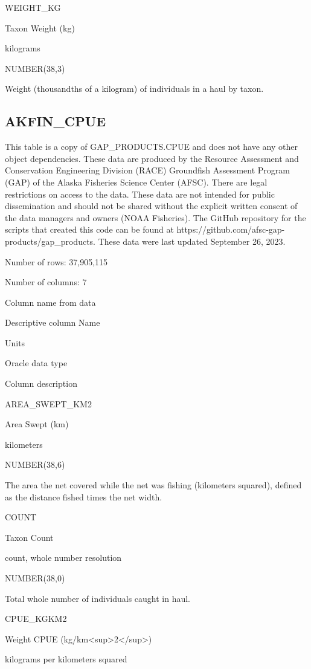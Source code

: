 \documentclass[
  letterpaper,
  oneside,
  open=any]{scrbook}
\begin{document}
WEIGHT\_KG

Taxon Weight (kg)

kilograms

NUMBER(38,3)

Weight (thousandths of a kilogram) of individuals in a haul by taxon.

\hypertarget{akfin_cpue}{%
\subsection{AKFIN\_CPUE}\label{akfin_cpue}}

This table is a copy of GAP\_PRODUCTS.CPUE and does not have any other
object dependencies. These data are produced by the Resource Assessment
and Conservation Engineering Division (RACE) Groundfish Assessment
Program (GAP) of the Alaska Fisheries Science Center (AFSC). There are
legal restrictions on access to the data. These data are not intended
for public dissemination and should not be shared without the explicit
written consent of the data managers and owners (NOAA Fisheries). The
GitHub repository for the scripts that created this code can be found at
https://github.com/afsc-gap-products/gap\_products. These data were last
updated September 26, 2023.

Number of rows: 37,905,115

Number of columns: 7

Column name from data

Descriptive column Name

Units

Oracle data type

Column description

AREA\_SWEPT\_KM2

Area Swept (km)

kilometers

NUMBER(38,6)

The area the net covered while the net was fishing (kilometers squared),
defined as the distance fished times the net width.

COUNT

Taxon Count

count, whole number resolution

NUMBER(38,0)

Total whole number of individuals caught in haul.

CPUE\_KGKM2

Weight CPUE (kg/km\textless sup\textgreater2\textless/sup\textgreater)

kilograms per kilometers squared
\end{document}
